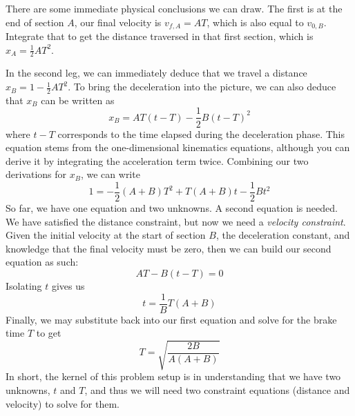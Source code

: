 \documentclass[a4paper]{article}
\begin{document}
\begin{center}
\end{center}

There are some immediate physical conclusions we can draw. The first is at the end of section \( A \), our final velocity is \( v_{f,A} = AT \), which is also equal to \( v_{0,B} \). Integrate that to get the distance traversed in that first section, which is \( x_{A} = \frac{1}{2}AT^{2} \).

In the second leg, we can immediately deduce that we travel a distance \( x_{B} = 1 - \frac{1}{2}AT^{2} \). To bring the deceleration into the picture, we can also deduce that \( x_{B} \) can be written as 
\[
	x_{B} = AT \!\left( t - T \right) - \frac{1}{2}B \!\left( t - T \right)^{2} 
\]
where \( t - T \) corresponds to the time elapsed during the deceleration phase. This equation stems from the one-dimensional kinematics equations, although you can derive it by integrating the acceleration term twice. Combining our two derivations for \( x_{B} \), we can write
\[
	1 = -\frac{1}{2} \!\left( A + B \right)T^{2} + T \!\left( A + B \right)t - \frac{1}{2}Bt^{2} 
\]
So far, we have one equation and two unknowns. A second equation is needed. We have satisfied the distance constraint, but now we need a \textit{velocity constraint}. Given the initial velocity at the start of section \( B \), the deceleration constant, and knowledge that the final velocity must be zero, then we can build our second equation as such:
\[
	AT - B \!\left( t - T \right) = 0
\]
Isolating \( t \) gives us
\[
	 t = \frac{1}{B}T \!\left( A + B \right)
\]
Finally, we may substitute back into our first equation and solve for the brake time \( T \) to get
\[
	T = \sqrt{\frac{2B}{A \!\left( A + B \right)}} 
\]
In short, the kernel of this problem setup is in understanding that we have two unknowns, \( t \) and \( T \), and thus we will need two constraint equations (distance and velocity) to solve for them.
\end{document}
